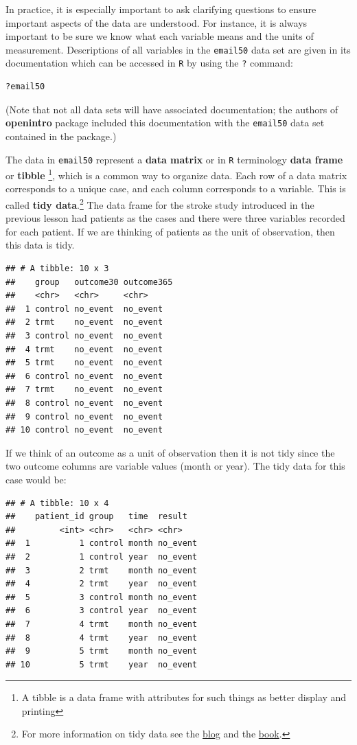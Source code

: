 \documentclass[
]{book}
\begin{document}
In practice, it is especially important to ask clarifying questions to ensure important aspects of the data are understood. For instance, it is always important to be sure we know what each variable means and the units of measurement. Descriptions of all variables in the \texttt{email50} data set are given in its documentation which can be accessed in \texttt{R} by using the \texttt{?} command:

\begin{verbatim}
?email50
\end{verbatim}

(Note that not all data sets will have associated documentation; the authors of \textbf{openintro} package included this documentation with the \texttt{email50} data set contained in the package.)

The data in \texttt{email50} represent a \textbf{data matrix} or in \texttt{R} terminology \textbf{data frame} or \textbf{tibble} \footnote{A tibble is a data frame with attributes for such things as better display and printing}, which is a common way to organize data. Each row of a data matrix corresponds to a unique case, and each column corresponds to a variable. This is called \textbf{tidy data}.\footnote{For more information on tidy data see the \href{https://simplystatistics.org/2016/02/17/non-tidy-data/}{blog} and the \href{https://r4ds.had.co.nz/tidy-data.html\#pivoting}{book}.} The data frame for the stroke study introduced in the previous lesson had patients as the cases and there were three variables recorded for each patient. If we are thinking of patients as the unit of observation, then this data is tidy.

\begin{verbatim}
## # A tibble: 10 x 3
##    group   outcome30 outcome365
##    <chr>   <chr>     <chr>     
##  1 control no_event  no_event  
##  2 trmt    no_event  no_event  
##  3 control no_event  no_event  
##  4 trmt    no_event  no_event  
##  5 trmt    no_event  no_event  
##  6 control no_event  no_event  
##  7 trmt    no_event  no_event  
##  8 control no_event  no_event  
##  9 control no_event  no_event  
## 10 control no_event  no_event
\end{verbatim}

If we think of an outcome as a unit of observation then it is not tidy since the two outcome columns are variable values (month or year). The tidy data for this case would be:

\begin{verbatim}
## # A tibble: 10 x 4
##    patient_id group   time  result  
##         <int> <chr>   <chr> <chr>   
##  1          1 control month no_event
##  2          1 control year  no_event
##  3          2 trmt    month no_event
##  4          2 trmt    year  no_event
##  5          3 control month no_event
##  6          3 control year  no_event
##  7          4 trmt    month no_event
##  8          4 trmt    year  no_event
##  9          5 trmt    month no_event
## 10          5 trmt    year  no_event
\end{verbatim}
\end{document}
